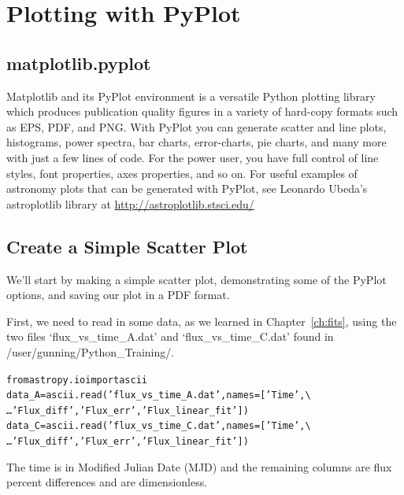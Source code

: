 \chapter{Plotting with PyPlot}
\label{ch:pyplot}

\section{matplotlib.pyplot}\label{s:pyplot_intro}
Matplotlib and its PyPlot environment is a versatile Python plotting
library which produces publication quality figures in a variety of
hard-copy formats such as EPS, PDF, and PNG.  With PyPlot you can
generate scatter and line plots, histograms, power spectra, bar
charts, error-charts, pie charts, and many more with just a few lines
of code. For the power user, you have full control of line styles,
font properties, axes properties, and so on. For useful examples of 
astronomy plots that can be generated with PyPlot, see Leonardo 
Ubeda's astroplotlib library at \href{http://astroplotlib.stsci.edu/}
{http://astroplotlib.stsci.edu/}


\section{Create a Simple Scatter Plot}\label{s:simple_plot}

We'll start by making a simple scatter plot, demonstrating some of 
the PyPlot options, and saving our plot in a PDF format. 

First, we need to read in some data, as we learned in Chapter~\ref{ch:fits},
using the two files `flux\_vs\_time\_A.dat' and `flux\_vs\_time\_C.dat' found
in /user/gunning/Python\_Training/.

\begin{alltt}
\pytab from astropy.io import ascii
\pytab data_A = ascii.read('flux_vs_time_A.dat', names=['Time',  \textbackslash 
\ldots 'Flux_diff', 'Flux_err', 'Flux_linear_fit'])
\pytab data_C = ascii.read('flux_vs_time_C.dat', names=['Time',  \textbackslash 
\ldots 'Flux_diff', 'Flux_err', 'Flux_linear_fit'])
\end{alltt}

The time is in Modified Julian Date (MJD) and the remaining 
columns are flux percent differences and are dimensionless. 

